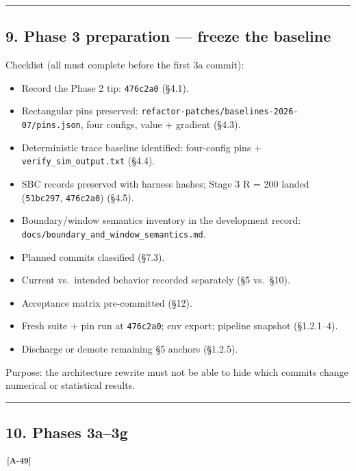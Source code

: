 \documentclass[
  10pt,
]{article}
\providecommand{\tightlist}{%
  \setlength{\itemsep}{0pt}\setlength{\parskip}{0pt}}
\newcommand{\amdref}[1]{{\color{amdcolor}\textsuperscript{\,\textbf{[#1]}}}}
\begin{document}
\begin{center}\rule{0.5\linewidth}{0.5pt}\end{center}

\hypertarget{phase-3-preparation-freeze-the-baseline}{%
\subsection{9. Phase 3 preparation --- freeze the baseline}\label{phase-3-preparation-freeze-the-baseline}}

Checklist (all must complete before the first 3a commit):

\begin{itemize}
\tightlist
\item[$\boxtimes$]
  Record the Phase 2 tip: \texttt{476c2a0} (§4.1).
\item[$\boxtimes$]
  Rectangular pins preserved: \texttt{refactor-patches/\allowbreak{}baselines-2026-07/\allowbreak{}pins.json}, four configs, value + gradient (§4.3).
\item[$\boxtimes$]
  Deterministic trace baseline identified: four-config pins + \texttt{verify\_sim\_output.txt} (§4.4).
\item[$\boxtimes$]
  SBC records preserved with harness hashes; Stage 3 R = 200 landed (\texttt{51bc297}, \texttt{476c2a0}) (§4.5).
\item[$\boxtimes$]
  Boundary/window semantics inventory in the development record: \texttt{docs/\allowbreak{}boundary\_\allowbreak{}and\_\allowbreak{}window\_\allowbreak{}semantics.md}.
\item[$\boxtimes$]
  Planned commits classified (§7.3).
\item[$\boxtimes$]
  Current vs.~intended behavior recorded separately (§5 vs.~§10).
\item[$\boxtimes$]
  Acceptance matrix pre-committed (§12).
\item[$\boxtimes$]
  Fresh suite + pin run at \texttt{476c2a0}; env export; pipeline snapshot (§1.2.1--4).
\item[$\boxtimes$]
  Discharge or demote remaining §5 anchors (§1.2.5).
\end{itemize}

Purpose: the architecture rewrite must not be able to hide which commits change numerical or statistical results.

\begin{center}\rule{0.5\linewidth}{0.5pt}\end{center}

\hypertarget{phases-3a3g}{%
\subsection{10. Phases 3a--3g}\label{phases-3a3g}}
\amdref{A-49}
\end{document}
